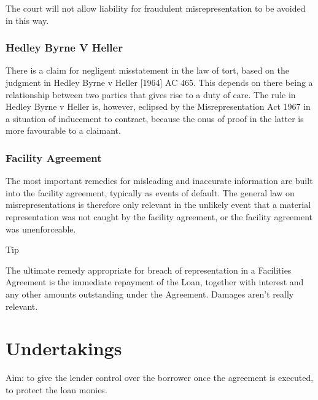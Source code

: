\documentclass[
]{article}
\newenvironment{env-a0fe8824-15a9-47d5-bf01-f54598533eae}
{
    \savenotes\tcolorbox[blanker,breakable,left=5pt,borderline west={2pt}{-4pt}{cyan}]
}
{
    \endtcolorbox\spewnotes
}
\begin{document}
The court will not allow liability for fraudulent misrepresentation to
be avoided in this way.

\hypertarget{hedley-byrne-v-heller}{%
\subsubsection{Hedley Byrne V Heller}\label{hedley-byrne-v-heller}}

There is a claim for negligent misstatement in the law of tort, based on
the judgment in Hedley Byrne v Heller {[}1964{]} AC 465. This depends on
there being a relationship between two parties that gives rise to a duty
of care. The rule in Hedley Byrne v Heller is, however, eclipsed by the
Misrepresentation Act 1967 in a situation of inducement to contract,
because the onus of proof in the latter is more favourable to a
claimant.

\hypertarget{facility-agreement-1}{%
\subsubsection{Facility Agreement}\label{facility-agreement-1}}

The most important remedies for misleading and inaccurate information
are built into the facility agreement, typically as events of default.
The general law on misrepresentations is therefore only relevant in the
unlikely event that a material representation was not caught by the
facility agreement, or the facility agreement was unenforceable.

\begin{env-a0fe8824-15a9-47d5-bf01-f54598533eae}

Tip

The ultimate remedy appropriate for breach of representation in a
Facilities Agreement is the immediate repayment of the Loan, together
with interest and any other amounts outstanding under the Agreement.
Damages aren't really relevant.

\end{env-a0fe8824-15a9-47d5-bf01-f54598533eae}

\hypertarget{undertakings}{%
\section{Undertakings}\label{undertakings}}

Aim: to give the lender control over the borrower once the agreement is
executed, to protect the loan monies.
\end{document}
